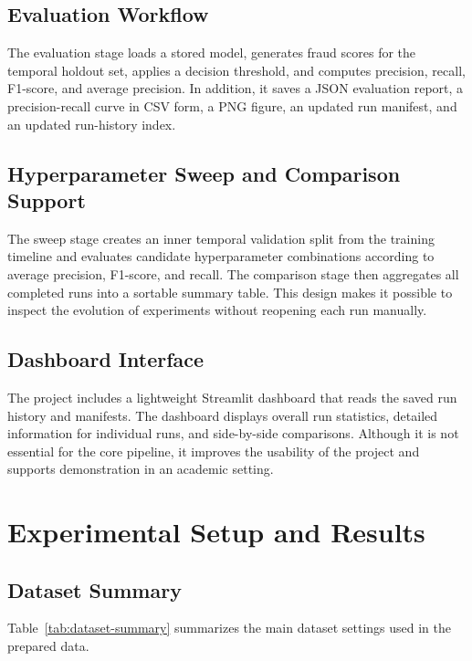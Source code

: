 \documentclass[12pt,a4paper]{report}
\begin{document}
\section{Evaluation Workflow}
The evaluation stage loads a stored model, generates fraud scores for the temporal holdout set, applies a decision threshold, and computes precision, recall, F1-score, and average precision. In addition, it saves a JSON evaluation report, a precision-recall curve in CSV form, a PNG figure, an updated run manifest, and an updated run-history index.

\section{Hyperparameter Sweep and Comparison Support}
The sweep stage creates an inner temporal validation split from the training timeline and evaluates candidate hyperparameter combinations according to average precision, F1-score, and recall. The comparison stage then aggregates all completed runs into a sortable summary table. This design makes it possible to inspect the evolution of experiments without reopening each run manually.

\section{Dashboard Interface}
The project includes a lightweight Streamlit dashboard that reads the saved run history and manifests. The dashboard displays overall run statistics, detailed information for individual runs, and side-by-side comparisons. Although it is not essential for the core pipeline, it improves the usability of the project and supports demonstration in an academic setting.

\chapter{Experimental Setup and Results}
\section{Dataset Summary}
Table~\ref{tab:dataset-summary} summarizes the main dataset settings used in the prepared data.
\end{document}
